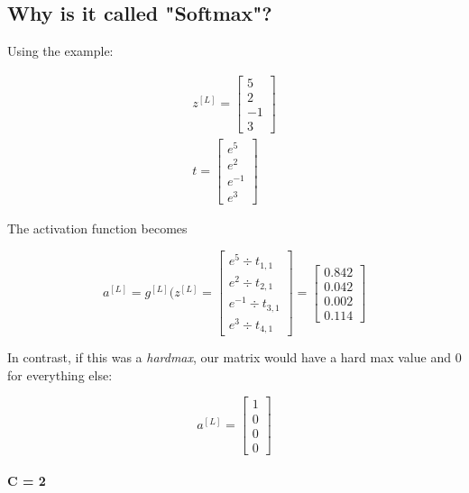 \documentclass{article}
\begin{document}
\subsection{Why is it called "Softmax"?}

Using the example:

\begin{align}
z^{[L]} =
\begin{bmatrix}
5 \\
2 \\
-1 \\
3
\end{bmatrix} \\
%
t =
\begin{bmatrix}
e^5 \\
e^2 \\
e^{-1} \\
e^3
\end{bmatrix}
\end{align}

The activation function becomes

\begin{equation}
a^{[L]} = g^{[L]}(z^{[L]} = \begin{bmatrix}
e^5 \div t_{1,1} \\
e^2 \div t_{2,1} \\
e^{-1} \div t_{3,1} \\
e^{3} \div t_{4,1}
\end{bmatrix} = \begin{bmatrix}
0.842 \\
0.042 \\
0.002 \\
0.114
\end{bmatrix}
\end{equation}

In contrast, if this was a \textit{hardmax}, our matrix would have a hard max value and 0 for everything else:

\begin{equation}
a^{[L]} = \begin{bmatrix}
1 \\
0 \\
0 \\
0
\end{bmatrix}
\end{equation}

\paragraph{C = 2}
\end{document}
